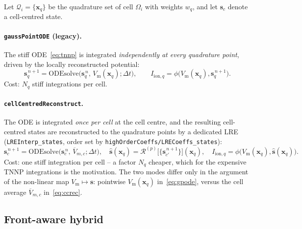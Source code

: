 \documentclass[11pt,a4paper]{article}
\newcommand{\code}[1]{\texttt{\small #1}}
\newcommand{\Vm}{V_{\text{m}}}
\newcommand{\Iionsub}[1]{I_{\mathrm{ion},#1}}
\newcommand{\dictkey}[1]{\textcolor{black!60!green}{\texttt{\footnotesize #1}}}
\begin{document}
Let $\mathcal{Q}_i=\{\mathbf{x}_q\}$ be the quadrature set of cell $\Omega_i$
with weights $w_q$, and let $\mathbf{s}_c$ denote a cell-centred state.

\paragraph{\code{gaussPointODE} (legacy).}
The stiff ODE~\eqref{eq:tnnp} is integrated \emph{independently at every
quadrature point}, driven by the locally reconstructed potential:
\begin{equation}
  \mathbf{s}_q^{\,n+1}
   = \mathrm{ODEsolve}\!\bigl(\mathbf{s}_q^{\,n},\,\Vm(\mathbf{x}_q);\Delta t\bigr),
  \qquad
  \Iionsub{q}=\phi\bigl(\Vm(\mathbf{x}_q),\mathbf{s}_q^{\,n+1}\bigr).
  \label{eq:gpode}
\end{equation}
Cost: $N_q$ stiff integrations per cell.

\paragraph{\code{cellCentredReconstruct}.}
The ODE is integrated \emph{once per cell} at the cell centre, and the
resulting cell-centred states are reconstructed to the quadrature points by a
dedicated LRE (\code{LREInterp\_states}, order set by
\dictkey{highOrderCoeffs/LRECoeffs\_states}):
\begin{equation}
  \mathbf{s}_c^{\,n+1}
   = \mathrm{ODEsolve}\!\bigl(\mathbf{s}_c^{\,n},\,\overline{V}_{m,c};\Delta t\bigr),
  \quad
  \widehat{\mathbf{s}}(\mathbf{x}_q)
   = \mathcal{R}^{(p)}\!\bigl[\{\mathbf{s}_{c'}^{\,n+1}\}\bigr](\mathbf{x}_q),
  \quad
  \Iionsub{q}=\phi\bigl(\Vm(\mathbf{x}_q),\widehat{\mathbf{s}}(\mathbf{x}_q)\bigr).
  \label{eq:ccrec}
\end{equation}
Cost: one stiff integration per cell -- a factor $N_q$ cheaper, which for the
expensive TNNP integrations is the motivation. The two modes differ only in the
argument of the non-linear map $\Vm\!\mapsto\!\mathbf{s}$: pointwise
$\Vm(\mathbf{x}_q)$ in~\eqref{eq:gpode}, versus the cell average
$\overline{V}_{m,c}$ in~\eqref{eq:ccrec}.

\subsection{Front-aware hybrid}
\label{sec:hybrid}
\end{document}
